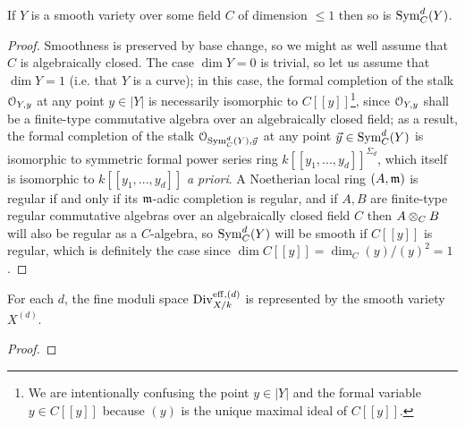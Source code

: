         \begin{lemma} \label{lemma: smoothness_of_symmetric_powers}
            If $Y$ is a smooth variety over some field $C$ of dimension $\leq 1$ then so is $\mathrm{Sym}_C^d(Y)$.
        \end{lemma}
            \begin{proof}
                Smoothness is preserved by base change, so we might as well assume that $C$ is algebraically closed. The case $\dim Y = 0$ is trivial, so let us assume that $\dim Y = 1$ (i.e. that $Y$ is a curve); in this case, the formal completion of the stalk $\mathcal{O}_{Y, y}$ at any point $y \in |Y|$ is necessarily isomorphic to $C[\![y]\!]$\footnote{We are intentionally confusing the point $y \in |Y|$ and the formal variable $y \in C[\![y]\!]$ because $(y)$ is the unique maximal ideal of $C[\![y]\!]$.}, since $\mathcal{O}_{Y, y}$ shall be a finite-type commutative algebra over an algebraically closed field; as a result, the formal completion of the stalk $\mathcal{O}_{\mathrm{Sym}^d_C(Y), \vec{y}}$ at any point $\vec{y} \in \mathrm{Sym}^d_C(Y)$ is isomorphic to symmetric formal power series ring $k[\![y_1, ..., y_d]\!]^{\Sigma_d}$, which itself is isomorphic to $k[\![y_1, ..., y_d]\!]$ \textit{a priori}. A Noetherian local ring $(A, \mathfrak{m})$ is regular if and only if its $\mathfrak{m}$-adic completion is regular, and if $A, B$ are finite-type regular commutative algebras over an algebraically closed field $C$ then $A \otimes_C B$ will also be regular as a $C$-algebra, so $\mathrm{Sym}_C^d(Y)$ will be smooth if $C[\![y]\!]$ is regular, which is definitely the case since $\dim C[\![y]\!] = \dim_C (y)/(y)^2 = 1$.
            \end{proof}
        \begin{proposition} \label{prop: symmetric_powers_of_curves_parametrise_divisors}
            For each $d$, the fine moduli space $\mathrm{Div}_{X/k}^{\mathrm{eff}, (d)}$ is represented by the smooth variety $X^{(d)}$.
        \end{proposition}
            \begin{proof}
                
            \end{proof}
        

